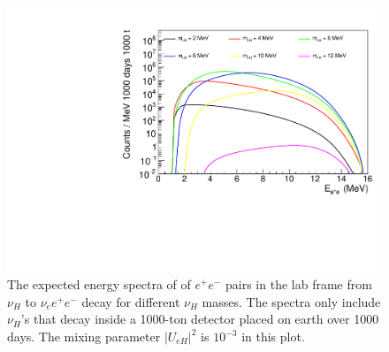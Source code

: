 \documentclass[%
 reprint,
 amsmath,amssymb,
 aps,
 prd,
twocolumn,
]{revtex4-1}
\begin{document}
\begin{figure}[!ht]
\includegraphics[width=0.99\columnwidth]{../plots/EeeSpectrum_decay_in_detector_integrate_U0.001_AllMass_linXlogY.pdf}
\caption{The expected energy spectra of of $e^+e^-$ pairs in the lab frame from $\nu_H$ to $\nu_e e^+ e^-$ decay for  different $\nu_H$ masses. 
The spectra only include $\nu_H$'s that decay inside a 1000-ton detector placed on earth over 1000 days. 
The mixing parameter $|U_{eH}|^2$ is  $10^{-3}$ in this plot.}
\label{fig:EeeSpectrum_in_detector_U1em3} 
\end{figure}


\end{document}
